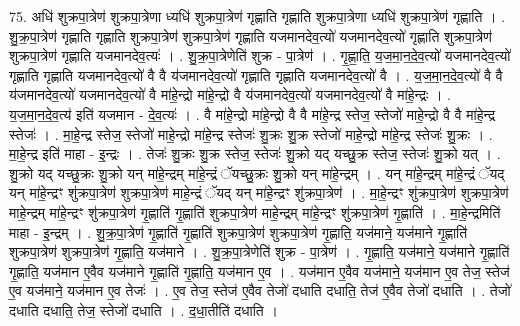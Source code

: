 \documentclass[17pt]{extarticle}
\begin{document}
75. अधि॑ शुक्रपा॒त्रेण॑ शुक्रपा॒त्रेणा ध्यधि॑ शुक्रपा॒त्रेण॑ गृह्णाति गृह्णाति शुक्रपा॒त्रेणा ध्यधि॑ शुक्रपा॒त्रेण॑ गृह्णाति । . शु॒क्र॒पा॒त्रेण॑ गृह्णाति गृह्णाति शुक्रपा॒त्रेण॑ शुक्रपा॒त्रेण॑ गृह्णाति यजमानदेव॒त्यो॑ यजमानदेव॒त्यो॑ गृह्णाति शुक्रपा॒त्रेण॑ शुक्रपा॒त्रेण॑ गृह्णाति यजमानदेव॒त्यः॑ । . शु॒क्र॒पा॒त्रेणेति॑ शुक्र - पा॒त्रेण॑ । . गृ॒ह्णा॒ति॒ य॒ज॒मा॒न॒दे॒व॒त्यो॑ यजमानदेव॒त्यो॑ गृह्णाति गृह्णाति यजमानदेव॒त्यो॑ वै वै य॑जमानदेव॒त्यो॑ गृह्णाति गृह्णाति यजमानदेव॒त्यो॑ वै । . य॒ज॒मा॒न॒दे॒व॒त्यो॑ वै वै य॑जमानदेव॒त्यो॑ यजमानदेव॒त्यो॑ वै मा॑हे॒न्द्रो मा॑हे॒न्द्रो वै य॑जमानदेव॒त्यो॑ यजमानदेव॒त्यो॑ वै मा॑हे॒न्द्रः । . य॒ज॒मा॒न॒दे॒व॒त्य॑ इति॑ यजमान - दे॒व॒त्यः॑ । . वै मा॑हे॒न्द्रो मा॑हे॒न्द्रो वै वै मा॑हे॒न्द्र स्तेज॒ स्तेजो॑ माहे॒न्द्रो वै वै मा॑हे॒न्द्र स्तेजः॑ । . मा॒हे॒न्द्र स्तेज॒ स्तेजो॑ माहे॒न्द्रो मा॑हे॒न्द्र स्तेजः॑ शु॒क्रः शु॒क्र स्तेजो॑ माहे॒न्द्रो मा॑हे॒न्द्र स्तेजः॑ शु॒क्रः । . मा॒हे॒न्द्र इति॑ माहा - इ॒न्द्रः । . तेजः॑ शु॒क्रः शु॒क्र स्तेज॒ स्तेजः॑ शु॒क्रो यद् यच्छु॒क्र स्तेज॒ स्तेजः॑ शु॒क्रो यत् । . शु॒क्रो यद् यच्छु॒क्रः शु॒क्रो यन् मा॑हे॒न्द्रम् मा॑हे॒न्द्रं ॅयच्छु॒क्रः शु॒क्रो यन् मा॑हे॒न्द्रम् । . यन् मा॑हे॒न्द्रम् मा॑हे॒न्द्रं ॅयद् यन् मा॑हे॒न्द्रꣳ शु॑क्रपा॒त्रेण॑ शुक्रपा॒त्रेण॑ माहे॒न्द्रं ॅयद् यन् मा॑हे॒न्द्रꣳ शु॑क्रपा॒त्रेण॑ । . मा॒हे॒न्द्रꣳ शु॑क्रपा॒त्रेण॑ शुक्रपा॒त्रेण॑ माहे॒न्द्रम् मा॑हे॒न्द्रꣳ शु॑क्रपा॒त्रेण॑ गृ॒ह्णाति॑ गृ॒ह्णाति॑ शुक्रपा॒त्रेण॑ माहे॒न्द्रम् मा॑हे॒न्द्रꣳ शु॑क्रपा॒त्रेण॑ गृ॒ह्णाति॑ । . मा॒हे॒न्द्रमिति॑ माहा - इ॒न्द्रम् । . शु॒क्र॒पा॒त्रेण॑ गृ॒ह्णाति॑ गृ॒ह्णाति॑ शुक्रपा॒त्रेण॑ शुक्रपा॒त्रेण॑ गृ॒ह्णाति॒ यज॑माने॒ यज॑माने गृ॒ह्णाति॑ शुक्रपा॒त्रेण॑ शुक्रपा॒त्रेण॑ गृ॒ह्णाति॒ यज॑माने । . शु॒क्र॒पा॒त्रेणेति॑ शुक्र - पा॒त्रेण॑ । . गृ॒ह्णाति॒ यज॑माने॒ यज॑माने गृ॒ह्णाति॑ गृ॒ह्णाति॒ यज॑मान ए॒वैव यज॑माने गृ॒ह्णाति॑ गृ॒ह्णाति॒ यज॑मान ए॒व । . यज॑मान ए॒वैव यज॑माने॒ यज॑मान ए॒व तेज॒ स्तेज॑ ए॒व यज॑माने॒ यज॑मान ए॒व तेजः॑ । . ए॒व तेज॒ स्तेज॑ ए॒वैव तेजो॑ दधाति दधाति॒ तेज॑ ए॒वैव तेजो॑ दधाति । . तेजो॑ दधाति दधाति॒ तेज॒ स्तेजो॑ दधाति । . द॒धा॒तीति॑ दधाति । \newline
\pagebreak
{}
\end{document}
